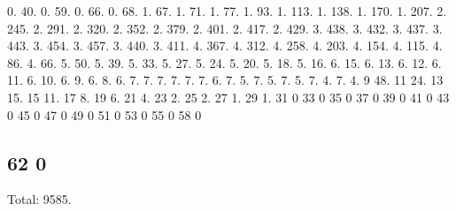 0. 40. 0. 59. 0. 66. 0. 68. 1. 67. 1. 71. 1. 77. 1. 93. 1. 113. 1. 138. 1. 170. 1. 207. 2. 245. 2. 291. 2. 320. 2. 352. 2. 379. 2. 401. 2. 417. 2. 429. 3. 438. 3. 432. 3. 437. 3. 443. 3. 454. 3. 457. 3. 440. 3. 411. 4. 367. 4. 312. 4. 258. 4. 203. 4. 154. 4. 115. 4. 86. 4. 66. 5. 50. 5. 39. 5. 33. 5. 27. 5. 24. 5. 20. 5. 18. 5. 16. 6. 15. 6. 13. 6. 12. 6. 11. 6. 10. 6. 9. 6. 8. 6. 7. 7. 7. 7. 7. 7. 6. 7. 5. 7. 5. 7. 5. 7. 4. 7. 4. 9 48. 11 24. 13 15. 15 11. 17 8. 19 6. 21 4. 23 2. 25 2. 27 1. 29 1. 31 0 33 0 35 0 37 0 39 0 41 0 43 0 45 0 47 0 49 0 51 0 53 0 55 0 58 0 \subsection*{62 0 }

Total\+: 9585. 